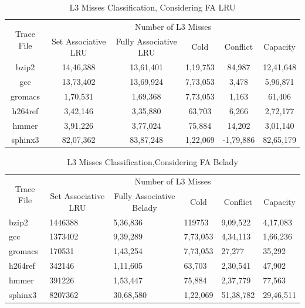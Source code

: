 \documentclass[]{article}
\begin{document}
\begin{table}[ht]
\centering
\begin{tabular}{|c|c|c|c|c|c|}
\hline
\multirow{2}{*}{Trace   File} & \multicolumn{5}{c|}{Number of L3 Misses}                                         \\ \cline{2-6} 
                              & Set   Associative LRU & Fully Associative LRU & Cold     & Conflict  & Capacity  \\ \hline
bzip2                         & 14,46,388             & 13,61,401             & 1,19,753 & 84,987    & 12,41,648 \\
gcc                           & 13,73,402             & 13,69,924             & 7,73,053 & 3,478     & 5,96,871  \\
gromacs                       & 1,70,531              & 1,69,368              & 7,73,053 & 1,163     & 61,406    \\
h264ref                       & 3,42,146              & 3,35,880              & 63,703   & 6,266     & 2,72,177  \\
hmmer                         & 3,91,226              & 3,77,024              & 75,884   & 14,202    & 3,01,140  \\
sphinx3                       & 82,07,362             & 83,87,248             & 1,22,069 & -1,79,886 & 82,65,179 \\
\hline
\end{tabular}
\caption{L3 Misses Classification, Considering FA LRU}
\end{table}




\begin{table}[h]
\begin{tabular}{|l|l|l|l|l|l|}
\hline
\multicolumn{1}{|c|}{\multirow{2}{*}{Trace   File}} & \multicolumn{5}{c|}{Number of L3 Misses}               \\ \cline{2-6} 
\multicolumn{1}{|c|}{} &
  \multicolumn{1}{c|}{Set   Associative LRU} &
  \multicolumn{1}{c|}{Fully Associative Belady} &
  \multicolumn{1}{c|}{Cold} &
  \multicolumn{1}{c|}{Conflict} &
  \multicolumn{1}{c|}{Capacity} \\ \hline
bzip2                                               & 1446388 & 5,36,836  & 119753   & 9,09,522  & 4,17,083  \\
gcc                                                 & 1373402 & 9,39,289  & 7,73,053 & 4,34,113  & 1,66,236  \\
gromacs                                             & 170531  & 1,43,254  & 7,73,053 & 27,277    & 35,292    \\
h264ref                                             & 342146  & 1,11,605  & 63,703   & 2,30,541  & 47,902    \\
hmmer                                               & 391226  & 1,53,447  & 75,884   & 2,37,779  & 77,563    \\
sphinx3                                             & 8207362 & 30,68,580 & 1,22,069 & 51,38,782 & 29,46,511\\
\hline
\end{tabular}
\caption{L3 Misses Classification,Considering FA Belady}
\end{table}



\end{document}
